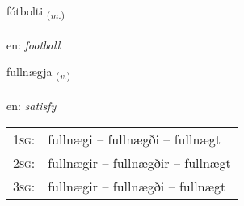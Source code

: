 \documentclass[frontgrid, backgrid]{flacards}\usepackage[]{graphicx}\usepackage[]{xcolor}
\begin{document}
\renewcommand{\blhead}{\vskip5pt {\small\bfseries\footnotesize Nafnorð | Noun }}
\renewcommand{\bcfoot}{\vskip5pt \hspace{2pt}{\small\bfseries\footnotesize 3K}}


{fótbolti \small{\textsubscript{(\textit{m.})}} \\[1ex] %
\textphonetic{[fouːtpɔl̥tɪ]} \\
en: \emph{football} \\  [2ex]
\renewcommand*{\arraystretch}{0.8}
}

\renewcommand{\flhead}{\vskip5pt \fboxsep=0pt {\small\bfseries\footnotesize Sagnorð | Verb}}
\renewcommand{\fcfoot}{\vskip5pt \fboxsep=0pt \hspace{2pt}{\small\bfseries\footnotesize 3K}}

\renewcommand{\blhead}{\vskip5pt {\small\bfseries\footnotesize Sagnorð | Verb }}
\renewcommand{\bcfoot}{\vskip5pt \hspace{2pt}{\small\bfseries\footnotesize 3K}}


{fullnægja \small{\textsubscript{(\textit{v.})}} \\[1ex] %
\textphonetic{[fʏtlnaija]} \\
en: \emph{satisfy} \\  [2ex]
\renewcommand*{\arraystretch}{0.8}
\begin{tabular}{p{1cm}l}
\textsc{1sg}: & fullnægi -- fullnægði -- fullnægt \\ 
\textsc{2sg}: & fullnægir -- fullnægðir -- fullnægt \\ 
\textsc{3sg}: & fullnægir -- fullnægði -- fullnægt \\ 
\end{tabular}
}
\end{document}
